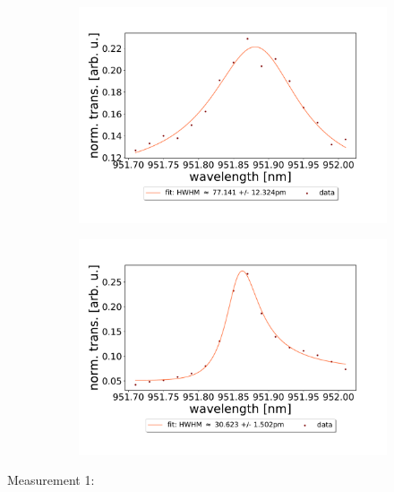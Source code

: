 \begin{figure}[h!]
    \centering
    \begin{subfigure}[b]{0.49\textwidth}
        \centering
        \includegraphics[width=\textwidth]{figures/results/double fano fits/30um_M3:M5_fit_4.pdf}
        \caption{}
        \label{fig:short_double_fano_trans}
    \end{subfigure}
    \begin{subfigure}[b]{0.49\textwidth}
        \centering
        \includegraphics[width=\textwidth]{figures/results/double fano fits/550um_M3:M5_fit_1.pdf}
        \caption{}
        \label{fig:long_double_fano_trans}
    \end{subfigure}
\end{figure}

Measurement 1:

